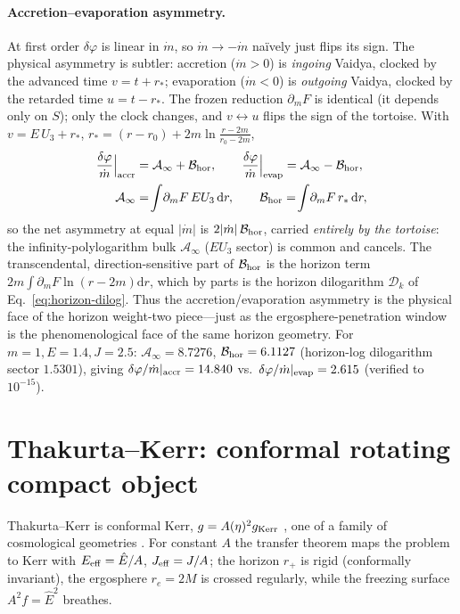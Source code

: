 \documentclass[
    aps, prd, twocolumn, superscriptaddress,
    showpacs, nofootinbib, floatfix
]{revtex4-2}
\newcommand{\Ehat}{\hat E}
\newcommand{\rp}{r_{+}}
\newcommand{\re}{r_{e}}
\newcommand{\dd}{\mathrm{d}}
\begin{document}
\paragraph{Accretion--evaporation asymmetry.} At first order $\delta\varphi$ is linear
in $\dot m$, so $\dot m\to-\dot m$ na\"ively just flips its sign. The physical
asymmetry is subtler: accretion ($\dot m>0$) is \emph{ingoing} Vaidya, clocked by the
advanced time $v=t+r_*$; evaporation ($\dot m<0$) is \emph{outgoing} Vaidya, clocked by
the retarded time $u=t-r_*$. The frozen reduction $\partial_m F$ is identical (it
depends only on $S$); only the clock changes, and $v\leftrightarrow u$ flips the sign
of the tortoise. With $v=E\,U_3+r_*$, $r_*=(r-r_0)+2m\ln\frac{r-2m}{r_0-2m}$,
\begin{equation}
\begin{aligned}
    \frac{\delta\varphi}{\dot m}\Big|_{\rm accr}&=\mathcal{A}_\infty+\mathcal{B}_{\rm hor},
    \qquad
    \frac{\delta\varphi}{\dot m}\Big|_{\rm evap}=\mathcal{A}_\infty-\mathcal{B}_{\rm hor},\\
    \mathcal{A}_\infty&=\!\int\!\partial_m F\,E U_3\,\dd r,
    \qquad
    \mathcal{B}_{\rm hor}=\!\int\!\partial_m F\,r_*\,\dd r,
\end{aligned}
    \label{eq:vaidya-asymmetry}
\end{equation}
so the net asymmetry at equal $|\dot m|$ is $2|\dot m|\,\mathcal{B}_{\rm hor}$, carried
\emph{entirely by the tortoise}: the infinity-polylogarithm bulk $\mathcal{A}_\infty$
($E U_3$ sector) is common and cancels. The transcendental, direction-sensitive part of
$\mathcal{B}_{\rm hor}$ is the horizon term $2m\!\int\!\partial_m F\ln(r-2m)\dd r$,
which by parts is the horizon dilogarithm $\mathcal{D}_k$ of
Eq.~\eqref{eq:horizon-dilog}. Thus the accretion/evaporation asymmetry is the physical
face of the horizon weight-two piece---just as the ergosphere-penetration window is the
phenomenological face of the same horizon geometry. For $m=1,E=1.4,J=2.5$:
$\mathcal{A}_\infty=8.7276$, $\mathcal{B}_{\rm hor}=6.1127$ (horizon-log dilogarithm
sector $1.5301$), giving $\delta\varphi/\dot m|_{\rm accr}=14.840$ vs.\
$\delta\varphi/\dot m|_{\rm evap}=2.615$ (verified to $10^{-15}$).


\section{Thakurta--Kerr: conformal rotating compact object}
\label{sec:thakurta}
Thakurta--Kerr is conformal Kerr, $g=A(\eta)^2 g_{\rm Kerr}$
\cite{Thakurta1981,Kerr1963}, one of a family of cosmological geometries
\cite{McVittie1933,SultanaDyer2005,Kaloper2010,NolanMcVittie1998,MelloMaciel2017,FaraoniBook}.
For constant $A$
the transfer theorem maps the problem to Kerr with $E_{\rm eff}=\Ehat/A$,
$J_{\rm eff}=J/A$; the horizon $\rp$ is rigid (conformally invariant), the
ergosphere $\re=2M$ is crossed regularly, while the freezing surface
$A^2 f=\Ehat^2$ breathes.
\end{document}
